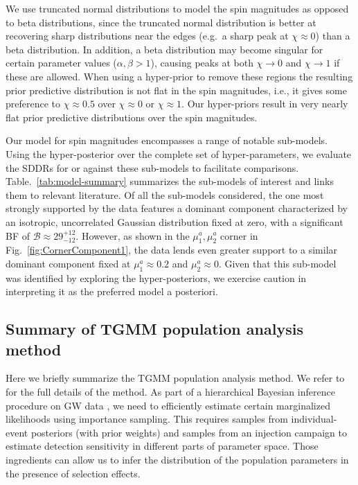\documentclass[twocolumn,usenames,dvipsnames,linenumbers]{aastex631}
\newcommand{\BFslowlyspinningtwocomponentdominant}{29^{+12}_{-12}}
\begin{document}
We use truncated normal distributions to model the spin magnitudes as opposed to beta distributions, since the truncated normal distribution is better at recovering sharp distributions near the edges (e.g.~a sharp peak at $\chi \approx 0$) than a beta distribution. 
In addition, a beta distribution may become singular for certain parameter values ($\alpha, \beta > 1$), causing peaks at both $\chi \to 0$ and $\chi \to 1$ if these are allowed. 
When using a hyper-prior to remove these regions the resulting prior predictive distribution is not flat in the spin magnitudes, i.e., it gives some preference to $\chi \approx 0.5$ over $\chi \approx 0$ or $\chi \approx 1$.
Our hyper-priors result in very nearly flat prior predictive distributions over the spin magnitudes.

Our model for spin magnitudes encompasses a range of notable sub-models. Using the hyper-posterior over the complete set of hyper-parameters, we evaluate the \acp{SDDR} for or against these sub-models to facilitate comparisons. Table.~\ref{tab:model-summary} summarizes the sub-models of interest and links them to relevant literature. Of all the sub-models considered, the one most strongly supported by the data features a dominant component characterized by an isotropic, uncorrelated Gaussian distribution fixed at zero, with a significant \ac{BF} of $\mathcal{B} \approx \BFslowlyspinningtwocomponentdominant$. However, as shown in the $\mu_1^a, \mu_2^a$ corner in Fig.~\ref{fig:CornerComponent1}, the data lends even greater support to a similar dominant component fixed at $\mu_1^a \approx 0.2$ and $\mu_2^a \approx 0$. Given that this sub-model was identified by exploring the hyper-posteriors, we exercise caution in interpreting it as the preferred model a posteriori.

\subsection{Summary of TGMM population analysis method}
Here we briefly summarize the \ac{TGMM} population analysis method. 
We refer to~\cite{TGMM_Methods} for the full details of the method. 
As part of a hierarchical Bayesian inference procedure on \ac{GW} data \citep{Mandel:2018mve,Thrane:2018qnx,Vitale:2020aaz}, we need to efficiently estimate certain marginalized likelihoods using importance sampling. 
This requires samples from individual-event posteriors (with prior weights) and samples from an injection campaign to estimate detection sensitivity in different parts of parameter space.
Those ingredients can allow us to infer the distribution of the population parameters in the presence of selection effects.
\end{document}
